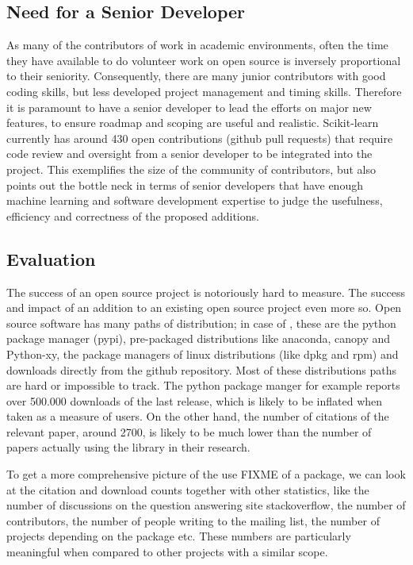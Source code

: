 \subsection{Need for a Senior Developer}
As many of the contributors of \sklearn{} work in academic environments,
often the time they have available to do volunteer work on open source is
inversely proportional to their seniority.
Consequently, there are many junior contributors with good coding skills,
but less developed project management and timing skills.
Therefore it is paramount to have a senior developer to lead the efforts
on major new features, to ensure roadmap and scoping are useful and realistic.
Scikit-learn currently has around 430 open contributions (github pull requests)
that require code review and oversight from a senior developer to be integrated
into the project. This exemplifies the size of the community of contributors,
but also points out the bottle neck in terms of senior developers that
have enough machine learning and software development expertise to judge
the usefulness, efficiency and correctness of the proposed additions.


\subsection{Evaluation}
The success of an open source project is notoriously hard to measure. The
success and impact of an addition to an existing open source project even more
so. Open source software has many paths of distribution; in case of \sklearn{},
these are the python package manager (pypi), pre-packaged distributions like
anaconda, canopy and Python-xy, the package managers of linux distributions (like dpkg and rpm)
and downloads directly from the github repository. Most of these distributions paths are hard
or impossible to track. The python package manger for example reports over 500.000 downloads of the last
release, which is likely to be inflated when taken as a measure of users.
On the other hand, the number of citations of the relevant
paper\autocite{pedregosa2011scikit}, around 2700, is likely to be much lower than
the number of papers actually using the \sklearn{} library in their research.

To get a more comprehensive picture of the use FIXME of a package, we can look
at the citation and download counts together with other statistics, like the
number of discussions on the question answering site stackoverflow, the number
of contributors, the number of people writing to the mailing list, the number
of projects depending on the package etc.
These numbers are particularly meaningful when compared to other projects with
a similar scope.

